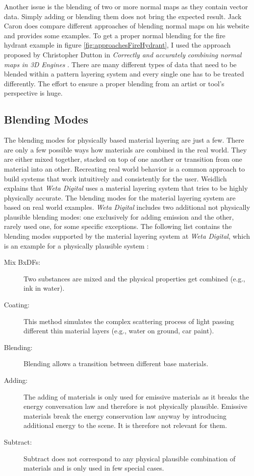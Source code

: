 Another issue is the blending of two or more normal maps as they contain vector data. Simply adding or blending them does not bring the expected result. Jack Caron \cite{caron2014} does compare different approaches of blending normal maps on his website and provides some examples. To get a proper normal blending for the fire hydrant example in figure \ref{fig:approachesFireHydrant}, I used the approach proposed by  Christopher Dutton in \emph{Correctly and accurately combining normal maps in 3D Engines} \cite{dutton2013correctly}. There are many different types of data that need to be blended within a pattern layering system and every single one has to be treated differently. The effort to ensure a proper blending from an artist or tool's perspective is huge.


\subsection{Blending Modes}\label{sec:blendingModes}

The blending modes for physically based material layering are just a few. There are only a few possible ways how materials are combined in the real world. They are either mixed together, stacked on top of one another or transition from one material into an other. Recreating real world behavior is a common approach to build systems that work intuitively and consistently for the user. 
Weidlich \cite{weidlich2011thinking} explains that \emph{Weta Digital} uses a material layering system that tries to be highly physically accurate. The blending modes for the material layering system are based on real world examples. \emph{Weta Digital} includes two additional not physically plausible blending modes: one exclusively for adding emission and the other, rarely used one, for some specific exceptions. The following list contains the blending modes supported by the material layering system at \emph{Weta Digital}, which is an example for a physically plausible system \cite{weidlich2011thinking}: 

\begin{description}
	\item [Mix BxDFs:] Two substances are mixed and the physical properties get combined (e.g., ink in water).
	\item [Coating:] This method simulates the complex scattering process of light passing different thin material layers (e.g., water on ground, car paint).
	\item [Blending:] Blending allows a transition between different base materials.
	\item [Adding:] The adding of materials is only used for emissive materials as it breaks the energy conversation law and therefore is not physically plausible. Emissive materials break the energy conservation law anyway by introducing additional energy to the scene. It is therefore not relevant for them.
	\item [Subtract:] Subtract does not correspond to any physical plausible combination of materials and is only used in few special cases.
\end{description}

